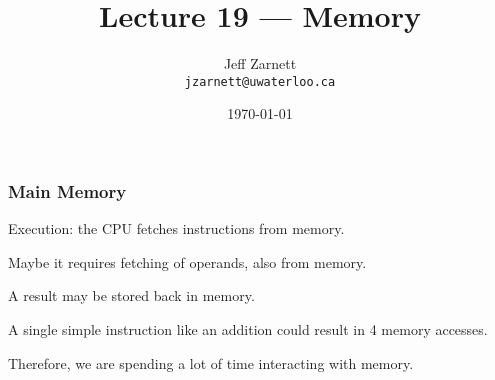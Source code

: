 

\title{Lecture 19 --- Memory }

\author{Jeff Zarnett \\ \small \texttt{jzarnett@uwaterloo.ca}}
\date{\today}




\begin{frame}
  \titlepage

 \end{frame}


\begin{frame}
\frametitle{Main Memory}

Execution: the CPU fetches instructions from memory.

Maybe it requires fetching of operands, also from memory. 

A result may be stored back in memory. 

A single simple instruction like an addition could result in 4 memory accesses. 

Therefore, we are spending a lot of time interacting with memory.


\end{frame}



\begin{frame}
\frametitle{}


\end{frame}

\begin{frame}
\frametitle{}


\end{frame}

\begin{frame}
\frametitle{}


\end{frame}

\begin{frame}
\frametitle{}


\end{frame}

\begin{frame}
\frametitle{}


\end{frame}

\begin{frame}
\frametitle{}


\end{frame}

